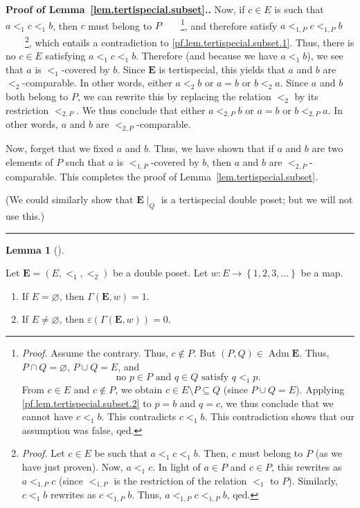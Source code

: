 \documentclass[numbers=enddot,12pt,final,onecolumn,notitlepage,abstracton]{scrartcl}
\theoremstyle{definition}
\newtheorem{lem}[theo]{Lemma}
\newenvironment{lemma}[1][]
{\begin{lem}[#1]\begin{leftbar}}
{\end{leftbar}\end{lem}}
\newenvironment{proof}[1][Proof]{\noindent\textbf{#1.} }{\ \rule{0.5em}{0.5em}}
\newcommand{\Adm}{\operatorname{Adm}}
\newcommand{\EE}{{\mathbf{E}}}
\begin{document}
\begin{proof}[Proof of Lemma~\ref{lem.tertispecial.subset}.]
Now, if $c \in E$ is such that $a <_1 c <_1 b$, then $c$ must
belong to $P$\ \ \ \ \footnote{\textit{Proof.} Assume the
contrary. Thus, $c \notin P$. But
$\left(P, Q\right) \in \Adm \EE$. Thus, $P \cap Q = \varnothing$,
$P \cup Q = E$, and
\begin{equation}
\text{no } p \in P \text{ and } q \in Q \text{ satisfy }
q <_1 p .
\label{pf.lem.tertispecial.subset.2}
\end{equation}
From $c \in E$ and $c \notin P$, we obtain
$c \in E\setminus P \subseteq Q$ (since $P \cup Q = E$).
Applying \eqref{pf.lem.tertispecial.subset.2} to $p = b$ and
$q = c$, we thus conclude that we cannot have $c <_1 b$.
This contradicts $c <_1 b$. This contradiction shows that our
assumption was false, qed.}, and therefore satisfy
$a <_{1,P} c <_{1,P} b$\ \ \ \ \footnote{\textit{Proof.}
Let $c \in E$ be such that $a <_1 c <_1 b$. Then, $c$ must
belong to $P$ (as we have just proven). Now, $a <_1 c$. In
light of $a \in P$ and $c \in P$, this rewrites as
$a <_{1,P} c$ (since $<_{1,P}$ is the restriction of the
relation $<_1$ to $P$). Similarly, $c <_1 b$ rewrites as
$c <_{1,P} b$. Thus, $a <_{1,P} c <_{1,P} b$, qed.},
which entails a
contradiction to \eqref{pf.lem.tertispecial.subset.1}. Thus, there
is no $c \in E$ satisfying $a <_1 c <_1 b$. Therefore (and
because we have $a <_1 b$), we see that $a$ is $<_1$-covered
by $b$. Since $\EE$ is tertispecial,
this yields that $a$ and $b$ are $<_2$-comparable. In other
words, either $a <_2 b$ or $a = b$ or $b <_2 a$. Since $a$ and
$b$ both belong to $P$, we can rewrite this by replacing the
relation $<_2$ by its restriction $<_{2,P}$. We thus conclude
that either $a <_{2,P} b$ or $a = b$ or $b <_{2,P} a$. In other
words, $a$ and $b$ are $<_{2,P}$-comparable.

Now, forget that we fixed $a$ and $b$.
Thus, we have shown that if $a$ and $b$ are two elements
of $P$ such that $a$ is $<_{1,P}$-covered by $b$, then $a$ and
$b$ are $<_{2,P}$-comparable. This completes the proof of
Lemma~\ref{lem.tertispecial.subset}.

(We could similarly show that $\EE\mid_Q$ is a tertispecial
double poset; but we will not use this.)
\end{proof}

\begin{lemma}
\label{lem.Gammaw.empty}Let $\EE = \left( E, <_1, <_2 \right)$ be a
double poset.
Let $w : E \rightarrow \left\{ 1, 2, 3, \ldots \right\}$ be a map.

\begin{enumerate}
\item[(a)] If $E = \varnothing$, then $\Gamma \left( \EE , w \right) = 1$.

\item[(b)] If $E \neq \varnothing$, then
$\varepsilon \left( \Gamma \left( \EE, w \right) \right) = 0$.
\end{enumerate}
\end{lemma}
\end{document}
